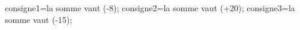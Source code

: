 \documentclass[exercice]{thedocument}%
\begin{document}
%
\>consigne1=la somme vaut (-8);%
\>consigne2=la somme vaut (+20);%
\>consigne3=la somme vaut (-15);%
%
\end{document}
